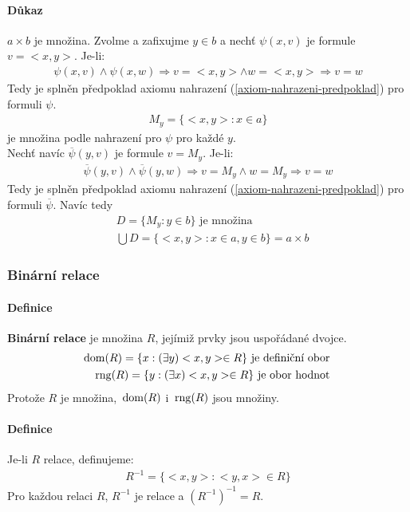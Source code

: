 \documentclass[a4paper,12pt,titlepage]{article}
\begin{document}
\paragraph{Důkaz}
$a \times b$ je množina. Zvolme a zafixujme $y \in b$ a
nechť $\psi(x,v)$ je formule $v = <x,y>$. Je-li:
\begin{align}
	\psi(x,v) \land \psi(x,w) \Rightarrow v = <x,y> \land w = <x,y> \Rightarrow
	v = w
\end{align}
Tedy je splněn předpoklad axiomu nahrazení (\ref{axiom-nahrazeni-predpoklad})
pro formuli $\psi$.
\begin{align}
	M_y = \{ <x,y> : x \in a\}
\end{align}
je množina podle nahrazení pro $\psi$ pro každé $y$. \\
Nechť navíc $\overline{\psi}(y,v)$ je formule $v = M_y$. Je-li:
\begin{align}
	\overline{\psi}(y,v) \land \overline{\psi}(y,w) \Rightarrow v = M_y \land w = M_y
	\Rightarrow v = w
\end{align}
Tedy je splněn předpoklad axiomu nahrazení (\ref{axiom-nahrazeni-predpoklad})
pro formuli $\overline{\psi}$. Navíc tedy
\begin{align}
	&D = \{ M_y : y \in b \} \text{ je množina } \\
	&\bigcup D = \{<x,y>: x \in a, y \in b \} = a \times b
\end{align}


\subsubsection{Binární relace}
\setcounter{equation}{0}
\paragraph{Definice}
\textbf{Binární relace} je množina $R$, jejímiž prvky jsou uspořádané dvojce.
\begin{align}
	\operatorname*{\,dom}(R) = \{ x : (\exists y) <x,y> \in R \} \text{ je definiční obor } \\
	\operatorname*{\,rng}(R) = \{ y : (\exists x) <x,y> \in R \} \text{ je obor hodnot }
\end{align}
Protože $R$ je množina, $\operatorname*{\,dom}(R)$ i $\operatorname*{\,rng}(R)$ jsou množiny.
\paragraph{Definice}
Je-li $R$ relace, definujeme:
\begin{align}
	R^{-1} = \{ <x,y>: <y,x> \in R \}
\end{align}
Pro každou relaci $R$, $R^{-1}$ je relace a $(R^{-1})^{-1} = R$.
\end{document}
